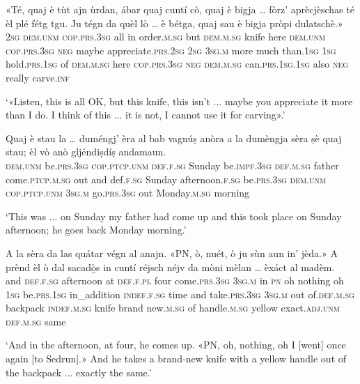\begin{linenumbers}
	\gll «Té, quaj è tùt ajn ùrdan, ábar quaj cuntí cò, quaj è bigja … fòrz’ aprècjèschas té èl plé fétg tgu. Ju tégn da quèl lò … è bétga, quaj sau è bigja pròpi dulatschè.»\\
	\textsc{2sg} \textsc{dem.unm} \textsc{cop.prs.3sg} all in order.\textsc{m.sg} but \textsc{dem.m.sg} knife here \textsc{dem.unm} \textsc{cop.prs.3sg} \textsc{neg} {} maybe appreciate.\textsc{prs.2sg} \textsc{2sg} \textsc{3sg.m} more much than.\textsc{1sg} \textsc{1sg} hold.\textsc{prs.1sg} of \textsc{dem.m.sg} here {} \textsc{cop.prs.3sg} \textsc{neg} \textsc{dem.m.sg} can.\textsc{prs.1sg.1sg} also \textsc{neg} really carve.\textsc{inf}\\
\end{linenumbers}
\medskip
\glt `«Listen, this is all OK, but this knife, this isn't ... maybe you appreciate it more than I do. I think of this ... it is not, I cannot use it for carving».' 
\medskip

\begin{linenumbers}
	\gll Quaj è stau la … duméngj’ èra al bab vagnúṣ anòra\footnotemark{} a la dumèngja sèra ṣè quaj stau; èl vò anò gljéndiṣdíṣ andamaun.\\
	\textsc{dem.unm} be.\textsc{prs.3sg} \textsc{cop.ptcp.unm} \textsc{def.f.sg} {} Sunday be.\textsc{impf.3sg} \textsc{def.m.sg} father come.\textsc{ptcp.m.sg} out and def.\textsc{f.sg} Sunday afternoon.\textsc{f.sg} be.\textsc{prs.3sg} \textsc{dem.unm} \textsc{cop.ptcp.unm} \textsc{3sg.m} go.\textsc{prs.3sg} out Monday.\textsc{m.sg} morning\\
\end{linenumbers}
\medskip
\glt `This was ... on Sunday my father had come up and this took place on Sunday afternoon; he goes back Monday morning.'
\medskip

\begin{linenumbers}
	\gll A la sèra da las quátar végn al anajn. «PN, ò, nuét, ò ju sùn aun\footnotemark{} in' jèda.» A prènd èl ò dal sacadò̱s in cuntí réjsch néjv da mòni mèlan … èxáct al madèm.\\
	and \textsc{def.f.sg} afternoon at \textsc{def.f.pl} four come.\textsc{prs.3sg} \textsc{3sg.m} in \textsc{pn} oh nothing oh \textsc{1sg} be.\textsc{prs.1sg} in\_addition \textsc{indef.f.sg} time and take.\textsc{prs.3sg} \textsc{3sg.m} out of.\textsc{def.m.sg} backpack \textsc{indef.m.sg} knife brand new.\textsc{m.sg} of handle.\textsc{m.sg} yellow {} exact.\textsc{adj.unm} \textsc{def.m.sg} same\\
\end{linenumbers}
\medskip
\glt `And in the afternoon, at four, he comes up. «PN, oh, nothing, oh I [went] once again [to Sedrun].» And he takes a brand-new knife with a yellow handle out of the backpack ... exactly the same.'
\medskip


